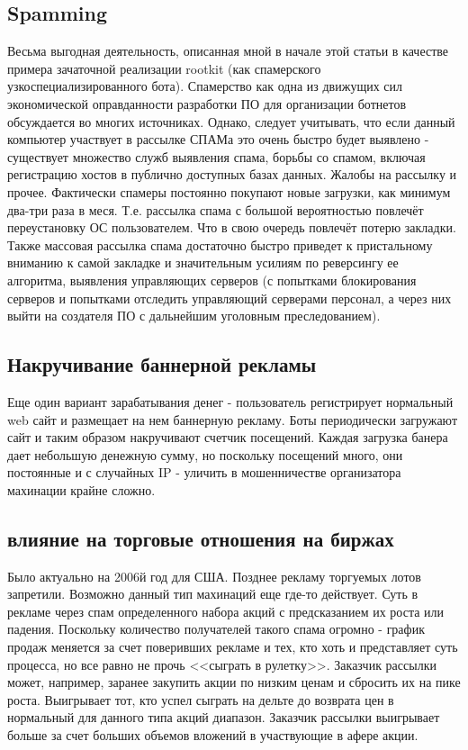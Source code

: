 \subsection{Spamming}

Весьма выгодная деятельность, описанная мной в начале этой статьи в
качестве примера зачаточной реализации rootkit (как спамерского
узкоспециализированного бота). Спамерство как одна из движущих сил экономической
оправданности разработки ПО для организации ботнетов обсуждается во многих источниках.
Однако,  следует учитывать, что если данный компьютер участвует в рассылке СПАМа это
очень быстро будет  выявлено - существует множество служб
выявления спама, борьбы со спамом, включая  регистрацию хостов в
публично доступных базах данных. Жалобы на рассылку и прочее. Фактически
спамеры постоянно покупают новые загрузки, как минимум два-три раза в
меся. Т.е. рассылка спама с большой  вероятностью повлечёт переустановку ОС
пользователем. Что в свою очередь повлечёт потерю закладки. Также массовая рассылка спама
достаточно быстро приведет к пристальному вниманию к самой закладке и значительным усилиям
по реверсингу ее алгоритма, выявления управляющих серверов (с попытками блокирования серверов и попытками отследить управляющий серверами персонал, а через них выйти на создателя ПО с дальнейшим уголовным преследованием).

\subsection{Накручивание баннерной рекламы}
Еще один вариант зарабатывания денег - пользователь регистрирует нормальный web сайт и размещает на нем баннерную рекламу. Боты периодически загружают сайт и таким образом накручивают счетчик посещений. Каждая
загрузка банера дает небольшую денежную сумму, но поскольку посещений много, они постоянные и с случайных
 IP - уличить в мошенничестве организатора махинации крайне сложно.

\subsection{влияние на торговые отношения на биржах}
Было актуально на 2006й год для США. Позднее рекламу торгуемых лотов запретили.
Возможно данный тип махинаций еще где-то действует. Суть в рекламе через спам
определенного набора акций с предсказанием их роста или падения. Поскольку
количество получателей такого спама огромно - график продаж меняется за счет
поверивших рекламе и тех, кто хоть и представляет суть процесса, но все равно не
прочь <<сыграть в рулетку>>. Заказчик рассылки может, например, заранее закупить
 акции по низким ценам и сбросить их на пике роста. Выигрывает тот, кто успел сыграть
на дельте до возврата цен в нормальный для данного типа акций диапазон. Заказчик
рассылки выигрывает больше за счет больших объемов вложений в участвующие в афере акции.

